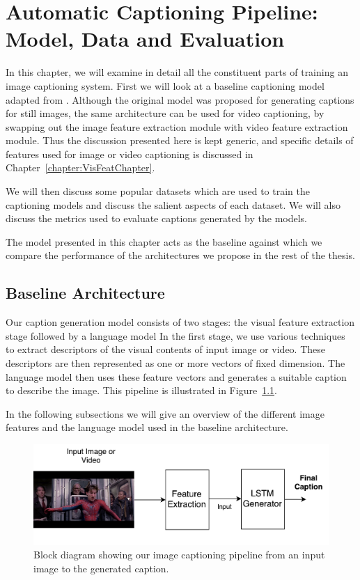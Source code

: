 \chapter{Automatic Captioning Pipeline: Model, Data and Evaluation}
\label{chapter:baseline}
In this chapter, we will examine in detail all the constituent parts
of training an image captioning system.
First we will look at a baseline captioning model adapted from
\cite{Vinyals_2015_CVPR}. 
Although the original model was proposed for generating captions for still
images, the same architecture can be used for video captioning, by
swapping out the image feature extraction module with video feature extraction
module.
Thus the discussion presented here is kept generic, and specific details of
features used for image or video captioning is discussed in
Chapter~\ref{chapter:VisFeatChapter}.

We will then discuss some popular datasets which are used to train the
captioning models and discuss the salient aspects of each dataset.
We will also discuss the metrics used to evaluate captions generated by the
models. 

The model presented in this chapter acts as the baseline against which we
compare the performance of the architectures we propose in the rest of the
thesis.

\section{Baseline Architecture} 

Our caption generation model consists of two stages: the visual
feature extraction stage followed by a language model
In the first stage, we use various techniques to extract descriptors of
the visual contents of input image or video.
These descriptors are then represented as one or more vectors of fixed
dimension.
The language model then uses these feature vectors and generates a
suitable caption to describe the image.
This pipeline is illustrated in Figure~\ref{fig_fullModel}. 

In the following subsections we will give an overview of the different image
features and the language model used in the baseline architecture.

\begin{figure}[t]
  \begin{center}
      \includegraphics[width=0.8\linewidth]{images/Thesis_generalBaseline.pdf}
  \end{center}
  \vspace*{-8mm}
  \caption{Block diagram showing our image captioning pipeline from an
  input image to the generated caption.}
  \label{fig_fullModel}
\end{figure}

